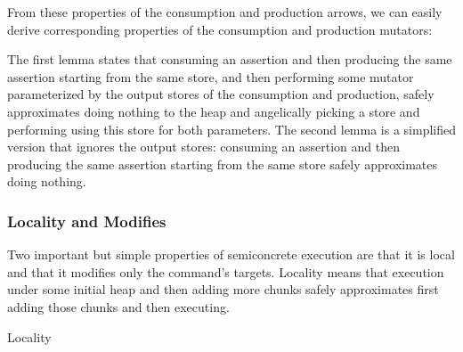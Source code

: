 \documentclass{CSML}
\newcommand{\display}[1]{}
\theoremstyle{definition}\newtheorem{notation}[thm]{Notation}
\theoremstyle{plain}\newtheorem{satz}[thm]{Satz}
\begin{document}
From these properties of the consumption and production arrows, we can 
easily derive corresponding properties of the consumption and production 
mutators:
\begin{lem}
\display{\begin{array}{l}
s_1 \leftarrow \mathsf{with}(s, \mathsf{consume}(a); \mathsf{store});\\
s_2 \leftarrow \mathsf{with}(s, \mathsf{produce}(a); \mathsf{store});\\
C(s_1, s_2)\\
\Rrightarrow\\
\bigoplus s'.\;C(s', s')
\end{array}}
\end{lem}

\begin{lem}
\display{\mathsf{with}(s, \mathsf{consume}(a)); \mathsf{with}(s, \mathsf{produce}(a)) \Rrightarrow \mathsf{noop}}
\end{lem}

The first lemma states that consuming an assertion and then 
producing the same assertion starting from the same store, and then 
performing some mutator  parameterized by the output 
stores of the consumption and production, safely approximates doing 
nothing to the heap and angelically picking a store and performing  
using this store for both parameters. The second lemma is a simplified 
version that ignores the output stores: consuming an assertion and then 
producing the same assertion starting from the same store safely 
approximates doing nothing.

\subsubsection{Locality and Modifies}

Two important but simple properties of semiconcrete execution are that it 
is local and that it modifies only the command's targets. Locality means 
that execution under some initial heap and then adding more chunks safely 
approximates first adding those chunks and then executing.

\begin{defi}{Locality}

\end{defi}

\begin{lem}

\end{lem}
\end{document}
